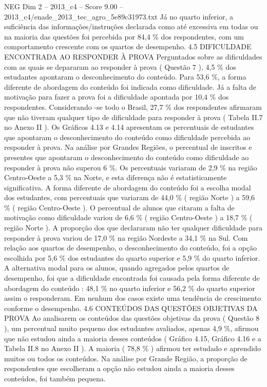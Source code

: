 \begin{textsample}{NEG Dim 2 – 2013\_c4 – Score 9.00 – 2013\_c4/enade\_2013\_tec\_agro\_5e89c31973.txt}
Já no quarto inferior, a suficiência das informações/instruções declarada como até excessiva em todas ou na maioria das questões foi percebida por 84,4 \% dos respondentes, com um comportamento crescente com os quartos de desempenho. 4.5 DIFICULDADE ENCONTRADA AO RESPONDER À PROVA Perguntados sobre as dificuldades com as quais se depararam ao responder à prova ( Questão 7 ), 4,5 \% dos estudantes apontaram o desconhecimento do conteúdo.
Para 53,6 \%, a forma diferente de abordagem do conteúdo foi indicada como dificuldade.
Já a falta de motivação para fazer a prova foi a dificuldade apontada por 10,4 \% dos respondentes.
Considerando -se todo o Brasil, 27,7 \% dos respondentes afirmaram que não tiveram qualquer tipo de dificuldade para responder à prova ( Tabela II.7 no Anexo II ).
Os Gráficos 4.13 e 4.14 apresentam os percentuais de estudantes que apontaram o desconhecimento do conteúdo como dificuldade percebida ao responder à prova.
Na análise por Grandes Regiões, o percentual de inscritos e presentes que apontaram o desconhecimento do conteúdo como dificuldade ao responder à prova não superou 6 \%.
Os percentuais variaram de 2,9 \% na região Centro-Oeste a 5,3 \% na Norte, e esta diferença não é estatisticamente significativa.
A forma diferente de abordagem do conteúdo foi a escolha modal dos estudantes, com percentuais que variaram de 44,0 \% ( região Norte ) a 59,6 \% ( região Centro-Oeste ).
O percentual de alunos que citaram a falta de motivação como dificuldade variou de 6,6 \% ( região Centro-Oeste ) a 18,7 \% ( região Norte ).
A proporção dos que declararam não ter qualquer dificuldade para responder à prova variou de 17,0 \% na região Nordeste a 34,1 \% na Sul.
Com relação aos quartos de desempenho, o desconhecimento do conteúdo, foi a opção escolhida por 5,6 \% dos estudantes do quarto superior e 5,9 \% do quarto inferior.
A alternativa modal para os alunos, quando agregados pelos quartos de desempenho, foi que a dificuldade encontrada foi causada pela forma diferente de abordagem do conteúdo : 48,1 \% no quarto inferior e 56,2 \% do quarto superior assim o responderam.
Em nenhum dos casos existe uma tendência de crescimento conforme o desempenho. 4.6 CONTEÚDOS DAS QUESTÕES OBJETIVAS DA PROVA Ao analisarem os conteúdos das questões objetivas da prova ( Questão 8 ), um percentual muito pequeno dos estudantes avaliados, apenas 4,9 \%, afirmou que não estudou ainda a maioria desses conteúdos ( Gráfico 4.15, Gráfico 4.16 e a Tabela II.8 no Anexo II ).
A maioria ( 78,8 \% ) afirmou ter estudado e aprendido muitos ou todos os conteúdos.
Na análise por Grande Região, a proporção de respondentes que escolheram a opção não estudou ainda a maioria desses conteúdos, foi também pequena.

\end{textsample}
